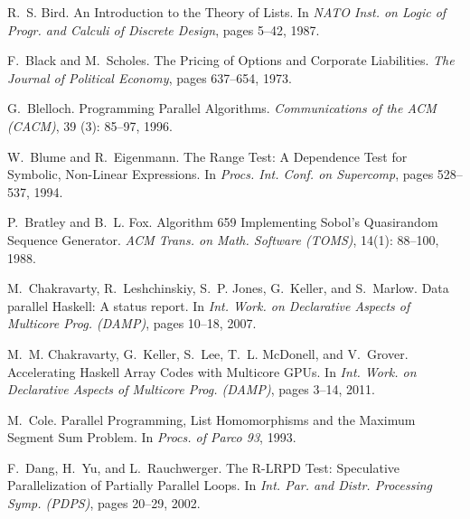\documentclass{sigplanconf}  %
\begin{document}
\begin{thebibliography}{49}
R.~S. Bird.
\newblock An {I}ntroduction to the {T}heory of {L}ists.
\newblock In \emph{NATO Inst. on Logic of Progr. and Calculi of Discrete
  Design}, pages 5--42, 1987.

F.~Black and M.~Scholes.
\newblock The {P}ricing of {O}ptions and {C}orporate {L}iabilities.
\newblock \emph{The Journal of Political Economy}, pages 637--654, 1973.

G.~Blelloch.
\newblock Programming {P}arallel {A}lgorithms.
\newblock \emph{Communications of the {ACM} (CACM)}, 39 (3):
  85--97, 1996.

W.~Blume and R.~Eigenmann.
\newblock The {R}ange {T}est: {A} {D}ependence {T}est for {S}ymbolic,
  {N}on-{L}inear {E}xpressions.
\newblock In \emph{Procs. Int. Conf. on Supercomp}, pages 528--537, 1994.

P.~Bratley and B.~L. Fox.
\newblock Algorithm 659 {I}mplementing {S}obol's {Q}uasirandom {S}equence
  {G}enerator.
\newblock \emph{ACM Trans. on Math. Software (TOMS)}, 14(1): 88--100,
  1988.

M.~Chakravarty, R.~Leshchinskiy, S.~P. Jones, G.~Keller, and S.~Marlow.
\newblock Data parallel {H}askell: A status report.
\newblock In \emph{Int. Work. on Declarative Aspects of Multicore Prog.
  (DAMP)}, pages 10--18, 2007.

M.~M. Chakravarty, G.~Keller, S.~Lee, T.~L. McDonell, and V.~Grover.
\newblock Accelerating {H}askell {A}rray {C}odes with {M}ulticore {GPUs}.
\newblock In \emph{Int. Work. on Declarative Aspects of Multicore Prog.
  (DAMP)}, pages 3--14, 2011.

M.~Cole.
\newblock Parallel {P}rogramming, {L}ist {H}omomorphisms and the {M}aximum
  {S}egment {S}um {P}roblem.
\newblock In \emph{Procs. of Parco 93}, 1993.

F.~Dang, H.~Yu, and L.~Rauchwerger.
\newblock The {R-LRPD} {T}est: {S}peculative {P}arallelization of {P}artially
  {P}arallel {L}oops.
\newblock In \emph{Int. Par. and Distr. Processing Symp. (PDPS)}, pages 20--29,
  2002.


\end{thebibliography}
\end{document}
